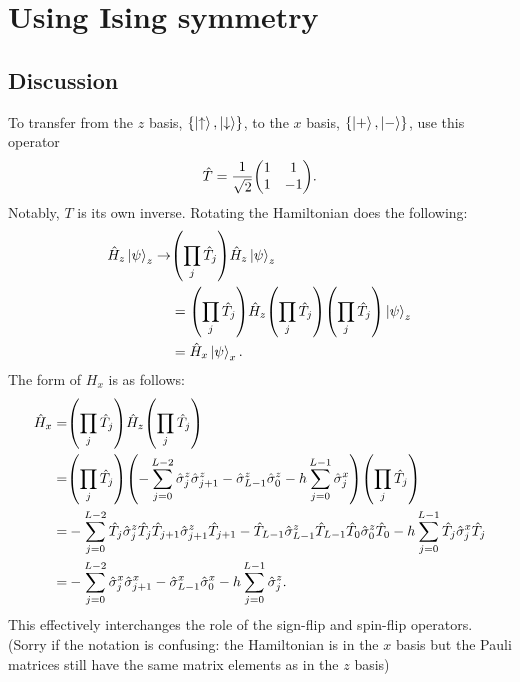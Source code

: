 \documentclass{article}
\begin{document}
\newpage

\section{
Using Ising symmetry
}

\subsection{
Discussion
}

To transfer from the $z$ basis, $\{\ket{\uparrow}, \ket{\downarrow} \}$,
to the $x$ basis, $\{\ket{+}, \ket{-}\}$, use this operator
\begin{align}
    \hat T = \frac{1}{\sqrt{2}} \mqty( 1 & 1 \\ 1 & -1 ).
\end{align}
Notably, $T$ is its own inverse. 
Rotating the Hamiltonian does the following:
\begin{align}
    \hat H_z \ket{\psi}_z
        \to& \qty( \prod_j \hat T_j ) \hat H_z \ket{\psi}_z
    \\
    &= \qty( \prod_j \hat T_j ) \hat H_z \qty( \prod_j \hat T_j )
        \qty( \prod_j \hat T_j ) \ket{\psi}_z 
    \\
    &= \hat H_x \ket{\psi}_x.
\end{align}
The form of $H_x$ is as follows:
\begin{align}
    \hat H_x =& \qty( \prod_j \hat T_j ) \hat H_z \qty( \prod_j \hat T_j )
    \\
    =& \qty( \prod_j \hat T_j )
        \qty( -\sum_{j=0}^{L-2} \hat \sigma^z_{j} \hat \sigma^z_{j+1} 
            - \hat \sigma^z_{L-1} \hat \sigma^z_{0}
            -h \sum_{j=0}^{L-1} \hat \sigma^x_{j})
        \qty( \prod_j \hat T_j )
    \\
    =& -\sum_{j=0}^{L-2} \hat T_j \hat \sigma^z_{j} \hat T_j
                        \hat T_{j+1} \hat \sigma^z_{j+1} \hat T_{j+1}
        - \hat T_{L-1} \hat \sigma^z_{L-1} \hat T_{L-1} 
             \hat T_{0}  \hat \sigma^z_{0} \hat T_{0} 
        -h \sum_{j=0}^{L-1}  \hat T_{j} \hat \sigma^x_{j} \hat T_{j}
    \\
    =& -\sum_{j=0}^{L-2} \hat \sigma^x_{j} \hat \sigma^x_{j+1}
        - \hat \sigma^x_{L-1} \hat \sigma^x_{0} 
        -h \sum_{j=0}^{L-1}  \hat \sigma^z_{j}.
\end{align}
This effectively interchanges the role of the sign-flip and spin-flip operators.
(Sorry if the notation is confusing: the Hamiltonian is in the $x$ basis but
the Pauli matrices still have the same matrix elements as in the $z$ basis)
\end{document}
